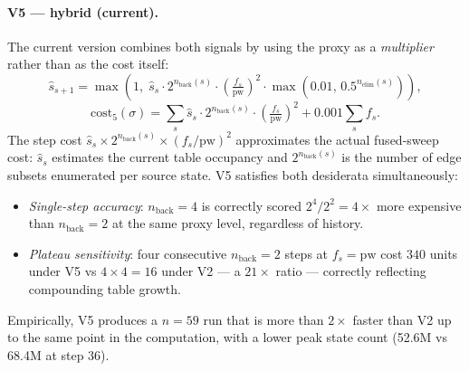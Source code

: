\documentclass[12pt]{article}
\theoremstyle{definition}
\newcommand{\pw}{\mathrm{pw}}
\newcommand{\nb}{n_{\mathrm{back}}}
\newcommand{\proxy}{\hat{s}}   %
\begin{document}
\paragraph{V5 — hybrid (current).}
The current version combines both signals by using the proxy as a
\emph{multiplier} rather than as the cost itself:
\begin{equation}
  \proxy_{s+1} = \max\!\left(1,\; \proxy_s
      \cdot 2^{\nb(s)} \cdot \!\left(\tfrac{f_s}{\pw}\right)^{\!2}
      \cdot \max\!\left(0.01,\, 0.5^{n_\mathrm{elim}(s)}\right)\right),
  \label{eq:proxy_update}
\end{equation}
\begin{equation}
  \mathrm{cost}_5(\sigma)
    = \sum_s \proxy_s \cdot 2^{\nb(s)} \cdot \!\left(\tfrac{f_s}{\pw}\right)^{\!2}
      + 0.001 \sum_s f_s.
  \label{eq:cost_fn_v5}
\end{equation}
The step cost $\proxy_s \times 2^{\nb(s)} \times (f_s/\pw)^2$
approximates the actual fused-sweep cost: $\proxy_s$ estimates the
current table occupancy and $2^{\nb(s)}$ is the number of edge subsets
enumerated per source state.
V5 satisfies both desiderata simultaneously:
\begin{itemize}[nosep]
  \item \emph{Single-step accuracy}: $\nb = 4$ is correctly scored
    $2^4/2^2 = 4\times$ more expensive than $\nb=2$ at the same proxy
    level, regardless of history.
  \item \emph{Plateau sensitivity}: four consecutive $\nb=2$ steps at
    $f_s = \pw$ cost $340$ units under V5 vs $4 \times 4 = 16$ under
    V2 — a $21\times$ ratio — correctly reflecting compounding table
    growth.
\end{itemize}
Empirically, V5 produces a $n=59$ run that is more than $2\times$
faster than V2 up to the same point in the computation, with a lower
peak state count (52.6M vs 68.4M at step 36).
\end{document}
